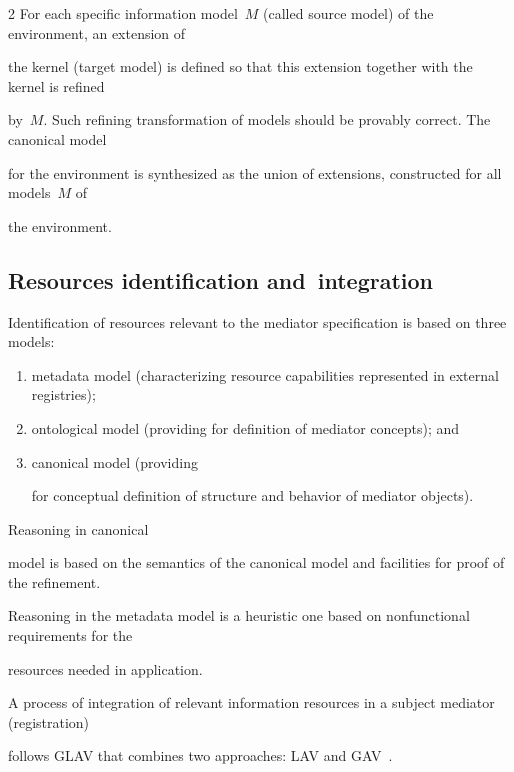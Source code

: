 \begin{multicols}{2}
For each specific information model~$M$ (called source model) of the environment, an extension of 

the kernel (target model) is defined so that this extension together with the kernel is refined 

by~$M$. Such refining transformation of models should be provably correct. The canonical model 

for the environment is synthesized as the union of extensions, constructed for all models~$M$ of 

the environment.



\subsection{Resources identification and~integration}



\noindent

Identification of resources relevant to the mediator specification is based on three models: 

\begin{enumerate}[($i$)]

\item metadata model (characterizing resource capabilities represented in external registries); 

\item ontological model (providing for definition of mediator concepts); and 

\item canonical model (providing 

for conceptual definition of structure and behavior of mediator objects). 

\end{enumerate}



Reasoning in canonical 

model is based on the semantics of the canonical model and facilities for proof of the refinement. 

Reasoning in the metadata model is a heuristic one based on nonfunctional requirements for the 

resources needed in application.



A process of integration of relevant information resources in a subject mediator (registration) 

follows GLAV that combines two approaches: LAV and GAV~\cite{4kal}. 


\end{multicols}
